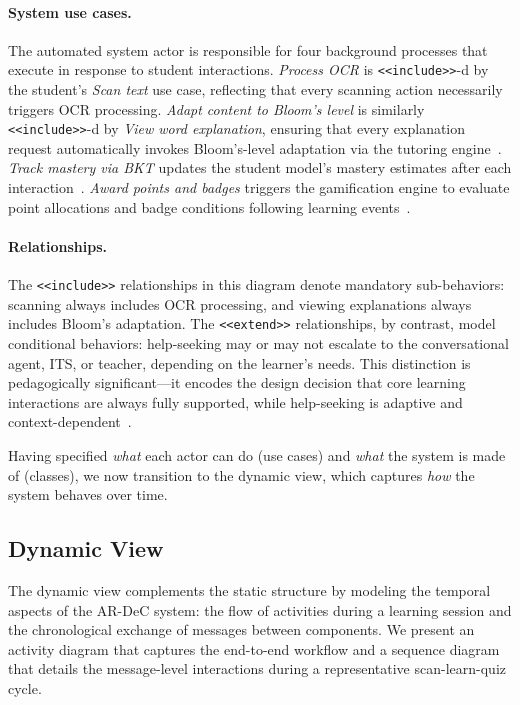 \paragraph{System use cases.}
The automated system actor is responsible for four background processes that execute in response to student interactions. \emph{Process OCR} is \texttt{<<include>>}-d by the student's \emph{Scan text} use case, reflecting that every scanning action necessarily triggers OCR processing. \emph{Adapt content to Bloom's level} is similarly \texttt{<<include>>}-d by \emph{View word explanation}, ensuring that every explanation request automatically invokes Bloom's-level adaptation via the tutoring engine~\cite{Bloom1956,Krathwohl2002}. \emph{Track mastery via BKT} updates the student model's mastery estimates after each interaction~\cite{Corbett1994}. \emph{Award points and badges} triggers the gamification engine to evaluate point allocations and badge conditions following learning events~\cite{Keller2010,Deterding2011}.

\paragraph{Relationships.}
The \texttt{<<include>>} relationships in this diagram denote mandatory sub-behaviors: scanning always includes OCR processing, and viewing explanations always includes Bloom's adaptation. The \texttt{<<extend>>} relationships, by contrast, model conditional behaviors: help-seeking may or may not escalate to the conversational agent, ITS, or teacher, depending on the learner's needs. This distinction is pedagogically significant---it encodes the design decision that core learning interactions are always fully supported, while help-seeking is adaptive and context-dependent~\cite{Ouariach2026}.

Having specified \emph{what} each actor can do (use cases) and \emph{what} the system is made of (classes), we now transition to the dynamic view, which captures \emph{how} the system behaves over time.

\subsection{Dynamic View}
\label{sec:dynamic}

The dynamic view complements the static structure by modeling the temporal aspects of the AR-DeC system: the flow of activities during a learning session and the chronological exchange of messages between components. We present an activity diagram that captures the end-to-end workflow and a sequence diagram that details the message-level interactions during a representative scan-learn-quiz cycle.

